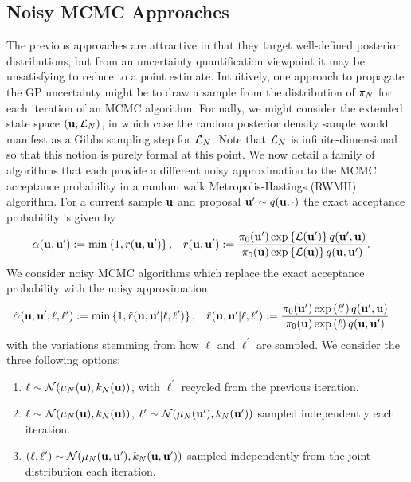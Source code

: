 \documentclass[12pt]{article}
\begin{document}
\subsection{Noisy MCMC Approaches}
The previous approaches are attractive in that they target well-defined posterior distributions, but from an uncertainty quantification viewpoint it may
be unsatisfying to reduce to a point estimate. Intuitively, one approach to propagate the GP uncertainty might be to draw a sample from the 
distribution of $\postDens_{\Ndesign}$ for each iteration of an MCMC algorithm. Formally, we might consider the extended state space 
$(\bpar, \llik_{\Ndesign})$, in which case the random posterior density sample would manifest as a Gibbs sampling step for $\llik_{\Ndesign}$. 
Note that $\llik_{\Ndesign}$ is infinite-dimensional so that this notion is purely formal at this point. We now detail a family of algorithms that each 
provide a different noisy approximation to the MCMC acceptance probability in a random walk Metropolis-Hastings (RWMH) algorithm. For 
a current sample $\bpar$ and proposal $\bpar^\prime \sim \propDens(\bpar, \cdot)$ the exact acceptance probability is given by 
\begin{align*}
\accProbMH(\bpar, \bpar^\prime) 
&:= \min\left\{1, r(\bpar, \bpar^\prime) \right\}, && r(\bpar, \bpar^\prime) := 
\frac{\priorDens(\bpar^\prime) \exp\left\{\llik(\bpar^\prime)\right\} \propDens(\bpar^\prime,\bpar)}{\priorDens(\bpar) \exp\left\{\llik(\bpar)\right\} \propDens(\bpar, \bpar^\prime)}.
\end{align*}
We consider noisy MCMC algorithms which replace the exact acceptance probability with the noisy approximation 
\begin{align*}
\hat{\accProbMH}(\bpar, \bpar^\prime; \ell, \ell^\prime) 
&:= \min\left\{1, \hat{r}(\bpar, \bpar^\prime|\ell, \ell^\prime) \right\}, && \hat{r}(\bpar, \bpar^\prime|\ell, \ell^\prime)  := 
\frac{\priorDens(\bpar^\prime) \exp\left(\ell^\prime\right) \propDens(\bpar^\prime,\bpar)}{\priorDens(\bpar) \exp\left(\ell\right) \propDens(\bpar, \bpar^\prime)}
\end{align*}
with the variations stemming from how $\ell$ and $\ell^\prime$ are sampled. We consider the three following options: 
\begin{enumerate}
\item\label{gp-mcmc-pseudo-marginal} $\ell \sim \Gaussian(\GPMeanPred[\Ndesign](\bpar), \GPKerPred[\Ndesign](\bpar))$, with $\ell^\prime$ recycled from the previous iteration. 
\item\label{gp-mcmc-noisy} $\ell \sim \Gaussian(\GPMeanPred[\Ndesign](\bpar), \GPKerPred[\Ndesign](\bpar))$, $\ell^\prime \sim 
\Gaussian(\GPMeanPred[\Ndesign](\bpar^\prime), \GPKerPred[\Ndesign](\bpar^\prime))$ sampled independently each iteration. 
\item\label{gp-mcmc-noisy-cov} $(\ell, \ell^\prime) \sim \Gaussian(\GPMeanPred[\Ndesign](\bpar, \bpar^\prime), \GPKerPred[\Ndesign](\bpar, \bpar^\prime))$ sampled independently from the joint distribution each iteration. 
\end{enumerate}
\end{document}

